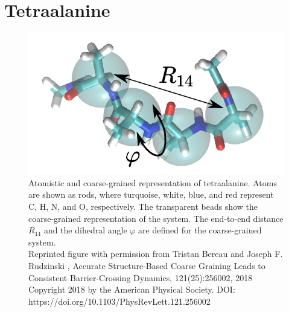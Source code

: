 \section{Tetraalanine}
\begin{figure}
\centering
 \includegraphics{../images/ala4.pdf}

\caption[Atomistic and coarse-grained representation of the tetraalanine peptide.]{Atomistic and coarse-grained representation of tetraalanine. Atoms are shown as rods,  where turquoise, white, blue, and red represent C, H, N, and O, respectively. The transparent beads show the coarse-grained representation of the system. The end-to-end distance $R_{14}$ and the dihedral angle $\varphi$ are defined for the coarse-grained system. \\
\tiny{Reprinted figure with permission from Tristan Bereau and Joseph F. Rudzinski ,  
Accurate Structure-Based Coarse Graining Leads to Consistent Barrier-Crossing Dynamics, 121(25):256002, 2018 Copyright 2018  by  the American Physical Society. DOI: https://doi.org/10.1103/PhysRevLett.121.256002}}

\label{fig:Ala4}
\end{figure}


